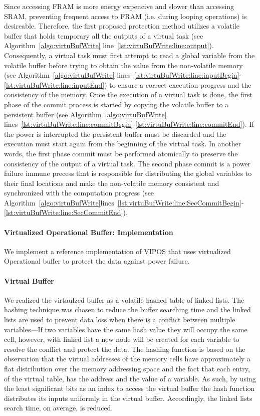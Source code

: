 \documentclass[sigconf,anonymous,review]{acmart}
\begin{document}
		Since accessing FRAM is more energy expencive and slower than accessing SRAM, preventing frequent access to FRAM (i.e. during looping operations) is desireable. Therefore, the first proposed protection method utilizes a volatile buffer that holds temporary all the outputs of a virtual task (see Algorithm~\ref{algo:virtuBufWrite} line~\ref{lst:virtuBufWrite:line:output}). Consequently, a virtual task must first attempt to read a global variable from the volatile buffer before trying to obtain the value from the non-volatile memory (see Algorithm~\ref{algo:virtuBufWrite} lines~\ref{lst:virtuBufWrite:line:inputBegin}-\ref{lst:virtuBufWrite:line:inputEnd}) to ensure a correct execution progress and the consistency of the memory. Once the execution of a virtual task is done, the first phase of the commit process is started by copying the volatile buffer to a persistent buffer (see Algorithm~\ref{algo:virtuBufWrite} lines~\ref{lst:virtuBufWrite:line:commitBegin}-\ref{lst:virtuBufWrite:line:commitEnd}). If the power is interrupted the persistent buffer must be discarded and the execution must start again from the beginning of the virtual task. In another words, the first phase commit must be performed atomically to preserve the consistency of the output of a virtual task. The second phase commit is a power failure immune precess that is responsible for distributing the global variables to their final locations and make the non-volatile memory consistent and synchronized with the computation progress (see Algorithm~\ref{algo:virtuBufWrite}lines~\ref{lst:virtuBufWrite:line:SecCommitBegin}-\ref{lst:virtuBufWrite:line:SecCommitEnd}).


	\paragraph{Virtualized Operational Buffer: Implementation} 

		We implement a reference implementation of VIPOS that uses virtualized Operational buffer to protect the data against power failure. 
		\paragraph{Virtual Buffer}
			We realized the virtaulzed buffer as a volatile hashed table of linked lists. The hashing technique was chosen to reduce the buffer searching time and the linked lists are used to prevent data loss when there is a conflict between multiple variables---If two variables have the same hash value they will occupy the same cell, however, with linked list a new node will be created for each variable to resolve the conflict and protect the data. The hashing function is based on the observation that the virtual addresses of the memory cells have approximately a flat distribution over the memory addressing space and the fact that each entry, of the virtual table, has the address and the value of a variable. As such, by using the least significant bits as an index to access the virtual buffer the hash function distributes its inputs uniformly in the virtual buffer. Accordingly, the linked lists search time, on average, is reduced.
\end{document}
